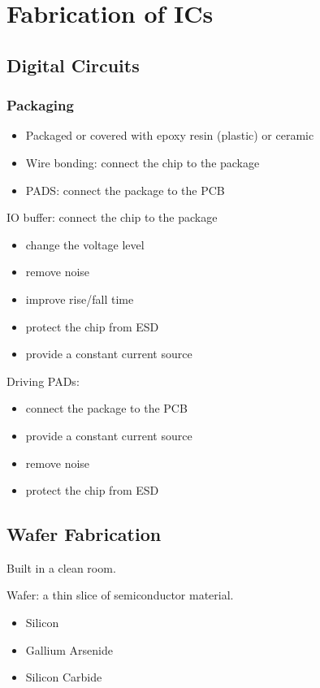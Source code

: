 \section{Fabrication of ICs}

\subsection{Digital Circuits}

\subsubsection{Packaging}
\begin{itemize}
    \item Packaged or covered with epoxy resin (plastic) or ceramic
    \item Wire bonding: connect the chip to the package
    \item PADS: connect the package to the PCB
\end{itemize}

IO buffer: connect the chip to the package\begin{itemize}
    \item change the voltage level
    \item remove noise
    \item improve rise/fall time
    \item protect the chip from ESD
    \item provide a constant current source
\end{itemize}

Driving PADs: \begin{itemize}
    \item connect the package to the PCB
    \item provide a constant current source
    \item remove noise
    \item protect the chip from ESD
\end{itemize}

\subsection{Wafer Fabrication}

Built in a clean room.

Wafer: a thin slice of semiconductor material.\begin{itemize}
    \item Silicon
    \item Gallium Arsenide
    \item Silicon Carbide
\end{itemize}

